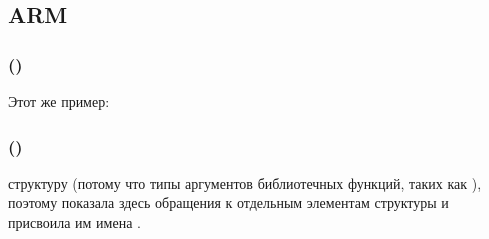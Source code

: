 ﻿\subsection{ARM}

\subsubsection{\OptimizingKeilVI (\ThumbMode)}

Этот же пример:



\subsubsection{\OptimizingXcodeIV (\ThumbTwoMode)}

\IDA {} структуру  
(потому что \IDA {} типы аргументов библиотечных функций, 
таких как ), 
поэтому показала здесь обращения к отдельным элементам структуры и присвоила им имена
.


